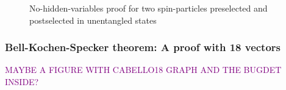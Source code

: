 \documentclass[%
  twocolumn,
 showpacs,
 showkeys,
 preprintnumbers,
 amsmath,amssymb,
 aps,
  pra,
  longbibliography,
 floatfix,
 ]{revtex4-1}
\newcommand{\jr}[1]{\textcolor{purple}{#1}}
\begin{document}
\begin{figure}
\caption{No-hidden-variables proof for two spin-particles preselected and postselected in unentangled states~\cite{Cab97}}
\end{figure}


\subsubsection{{B}ell-{K}ochen-{S}pecker theorem: A proof with 18 vectors}
\jr{\cite{Cab96}}

\jr{MAYBE A FIGURE WITH CABELLO18 GRAPH AND THE BUGDET INSIDE?}


%
\end{document}

